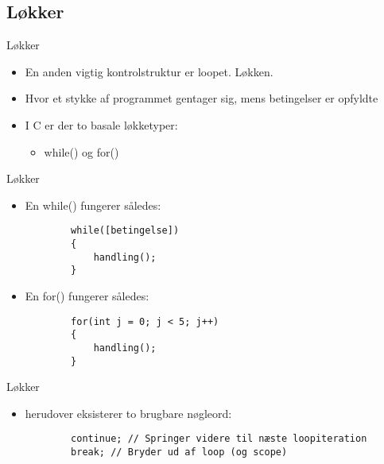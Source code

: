 \documentclass{beamer}
\begin{document}

\subsection{Løkker}

\begin{frame}[fragile]{Løkker}
	\begin{itemize}
		\item{En anden vigtig kontrolstruktur er loopet. Løkken.}
		\item{Hvor et stykke af programmet gentager sig, mens betingelser er opfyldte}
		\item{I C er der to basale løkketyper:}
		\begin{itemize}
			\item{{\color{C_darkblue}while}() og {\color{C_darkblue}for}()}
		\end{itemize}
	\end{itemize}
\end{frame}


\begin{frame}[fragile]{Løkker}
	\begin{itemize}
		\item{En {\color{C_darkblue}while}() fungerer således:}
		\begin{lstlisting}
		while([betingelse])
		{
			handling();
		}
		\end{lstlisting}
		\item{En {\color{C_darkblue}for}() fungerer således:}
		\begin{lstlisting}
		for(int j = 0; j < 5; j++)
		{
			handling();
		}
		\end{lstlisting}
	\end{itemize}
\end{frame}


\begin{frame}[fragile]{Løkker}
	\begin{itemize}
		\item{herudover eksisterer to brugbare nøgleord:}
		\begin{lstlisting}
		continue; // Springer videre til næste loopiteration
		break; // Bryder ud af loop (og scope)
		\end{lstlisting}
	\end{itemize}
\end{frame}
\end{document}
